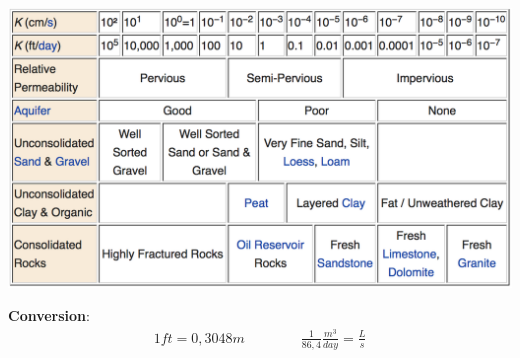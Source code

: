 \documentclass[landscape]{article}
\begin{document}
\begin{multicols*}{3}
    \begin{table}[H]
      \centering
      \includegraphics[width =.9\linewidth]{./img/table}
    \end{table}
    \textbf{Conversion}:
    \begin{align*}
        1ft = 0,3048 m \qquad \qquad \frac{1}{86,4}\frac{m^3}{day} = \frac{L}{s}
    \end{align*}


\newpage

\nocite{*}
\printbibliography
\end{multicols*}
\end{document}

